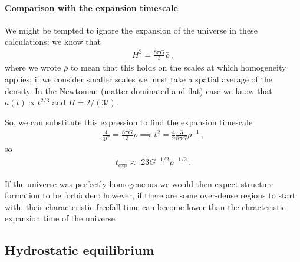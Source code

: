 \documentclass[main.tex]{subfiles}
\begin{document}
\paragraph{Comparison with the expansion timescale}

We might be tempted to ignore the expansion of the universe in these calculations: we know that
%
\begin{align}
  H^2 = \frac{8 \pi G}{3} \bar{\rho}
\,,
\end{align}
%
where we wrote \(\overline{\rho}\) to mean that this holds on the scales at which homogeneity applies; if we consider smaller scales we must take a spatial average of the density.
In the Newtonian (matter-dominated and flat) case we know that \(a(t) \propto t^{2/3}\) and \(H = 2/(3t)\). 

So, we can substitute this expression to find the expansion timescale  
%
\begin{align}
  \frac{4}{3 t^2} = \frac{8 \pi G}{3} \bar{\rho} 
  \implies 
  t^2 = \frac{4}{9} \frac{3}{8 \pi G} \bar{\rho}^{-1}
\,,
\end{align}
%
so 
%
\begin{align}
  t _{\text{exp}} \approx \num{.23} G^{-1/2} \bar{\rho}^{- 1/2}
\,.
\end{align}

If the universe was perfectly homogeneous we would then expect structure formation to be forbidden: however, if there are some over-dense regions to start with, their characteristic freefall time can become lower than the chracteristic expansion time of the universe. 




\subsection{Hydrostatic equilibrium}
\end{document}
